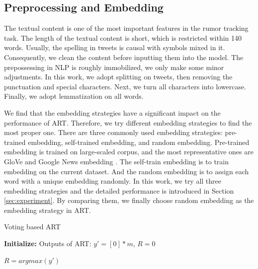 \subsection{Preprocessing and Embedding}
\label{sec:process_embedding}
The textual content is one of the most important features in the rumor tracking task. The length of the textual content is short, which is restricted within 140 words. Usually, the spelling in tweets is causal with symbols mixed in it. Consequently, we clean the content before inputting them into the model. The prepossessing in NLP is roughly immobilized, we only  make some minor adjustments. In this work, we adopt splitting on tweets, then removing the punctuation and special characters. Next, we turn all characters into lowercase. Finally, we adopt lemmatization on all words.

We find that the embedding strategies have a significant impact on the performance of ART. Therefore, we try different embedding strategies to find the most proper one. There are three commonly used embedding strategies: pre-trained embedding, self-trained embedding, and random embedding. Pre-trained embedding is trained on large-scaled corpus, and the most representative ones are GloVe \cite{DBLP:conf/emnlp/PenningtonSM14} and Google News embedding \cite{googlenews}. The self-train embedding is to train embedding on the current dataset. And the random embedding is to assign each word with a unique embedding randomly. In this work, we try all three embedding strategies and the detailed performance is introduced in Section \ref{sec:experiment}. By comparing them, we finally choose random embedding as the embedding strategy in ART.

\begin{algorithm}[tbp]
	\caption{Voting based ART}
	\label{algorithm:art}
	\LinesNumbered %
	\textbf{Initialize:} Outputs of ART: $y' = [0]*m$, $R = 0$ \;
	
	
	$R = argmax(y')$
\end{algorithm}


